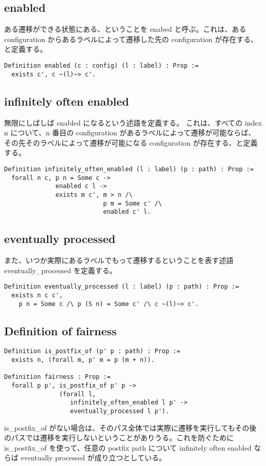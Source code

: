 \subsection{enabled}

ある遷移ができる状態にある、ということを enabed と呼ぶ。これは、ある configuration からあるラベルによって遷移した先の configuration が存在する、と定義する。

\begin{lstlisting}
Definition enabled (c : config) (l : label) : Prop :=
  exists c', c ~(l)~> c'.
\end{lstlisting}

\subsection{infinitely often enabled}
無限にしばしば enabled になるという述語を定義する。
これは、すべての index n について、n 番目の configuration があるラベルによって遷移が可能ならば、その先そのラベルによって遷移が可能になる configuration が存在する、と定義する。

\begin{lstlisting}
Definition infinitely_often_enabled (l : label) (p : path) : Prop :=
  forall n c, p n = Some c ->
              enabled c l ->
              exists m c', m > n /\
                           p m = Some c' /\
                           enabled c' l.
\end{lstlisting}


\subsection{eventually processed}
また、いつか実際にあるラベルでもって遷移するということを表す述語 eventually\_processed を定義する。

\begin{lstlisting}
Definition eventually_processed (l : label) (p : path) : Prop :=
  exists n c c',
    p n = Some c /\ p (S n) = Some c' /\ c ~(l)~> c'.
\end{lstlisting}


\subsection{Definition of fairness}

\begin{lstlisting}
Definition is_postfix_of (p' p : path) : Prop :=
  exists n, (forall m, p' m = p (m + n)).

Definition fairness : Prop :=
  forall p p', is_postfix_of p' p ->
               (forall l,
                  infinitely_often_enabled l p' ->
                  eventually_processed l p').
\end{lstlisting}


is\_postfix\_of がない場合は、そのパス全体では実際に遷移を実行してもその後のパスでは遷移を実行しないということがありうる。これを防ぐために is\_postfix\_of を使って、任意の postfix path について infinitely often enabled ならば eventually processed が成り立つとしている。
